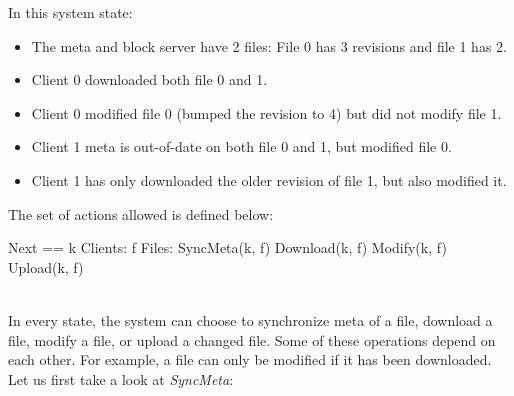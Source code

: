 In this system state:
\begin{itemize}
    \item The meta and block server have 2 files: File 0 has 3 revisions and file 1 has 2.
    \item Client 0 downloaded both file 0 and 1.
    \item Client 0 modified file 0 (bumped the revision to 4) but did not modify file 1.
    \item Client 1 meta is out-of-date on both file 0 and 1, but modified file 0.
    \item Client 1 has only downloaded the older revision of file 1, but also modified it.
\end{itemize}

The set of actions allowed is defined below:\\
\begin{tla}
Next ==
    \/ \E k \in Clients: 
        \E f \in Files: 
            \/ SyncMeta(k, f)
            \/ Download(k, f)
            \/ Modify(k, f)
            \/ Upload(k, f)
\end{tla}
\begin{tlatex}
%
%
%
%
%
%
%
\end{tlatex}
\\

In every state, the system can choose to synchronize meta of a file, download a
file, modify a file, or upload a changed file. Some of these operations depend
on each other. For example, a file can only be modified if it has been
downloaded.\\ 

Let us first take a look at \textit{SyncMeta}:\\

